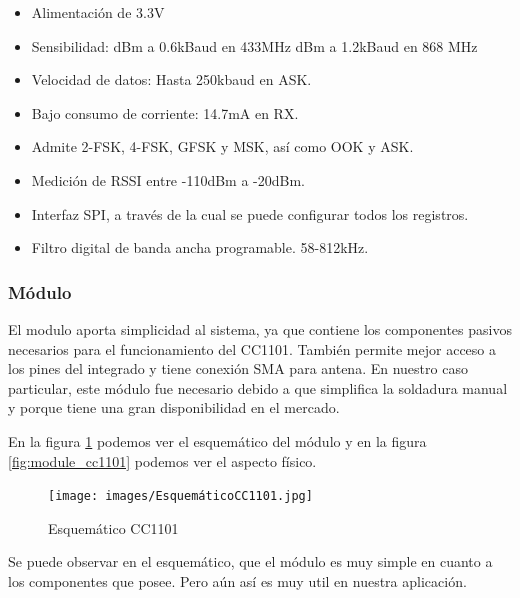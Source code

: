 \begin{itemize}
    \item Alimentación de 3.3V
    \item Sensibilidad: 
     dBm a 0.6kBaud en 433MHz
     dBm a 1.2kBaud en 868 MHz
    \item Velocidad de datos: Hasta 250kbaud en ASK.
    \item Bajo consumo de corriente: 14.7mA en RX.
    \item Admite 2-FSK, 4-FSK, GFSK y MSK, así como OOK y ASK.
    \item Medición de RSSI entre -110dBm a -20dBm.
    \item Interfaz SPI, a través de la cual se puede configurar todos los registros.
    \item Filtro digital de banda ancha programable. 58-812kHz.
\end{itemize}

\subsubsection{Módulo}

El modulo aporta simplicidad al sistema, ya que contiene los componentes pasivos necesarios para el funcionamiento del CC1101. También permite mejor acceso a los pines 
del integrado y tiene conexión SMA para antena. En nuestro caso particular, este módulo fue necesario debido a que simplifica la soldadura manual y porque
tiene una gran disponibilidad en el mercado.

En la figura \ref{fig:sch_cc1101} podemos ver el esquemático del módulo y en la figura \ref{fig:module_cc1101} podemos ver el aspecto físico.

\begin{figure}[htb]
	\centering
	\texttt{[image: images/EsquemáticoCC1101.jpg]}
    \caption{Esquemático CC1101}
	\label{fig:sch_cc1101}
\end{figure}

Se puede observar en el esquemático, que el módulo es muy simple en cuanto a los componentes que posee. Pero aún así es muy util en nuestra aplicación.

